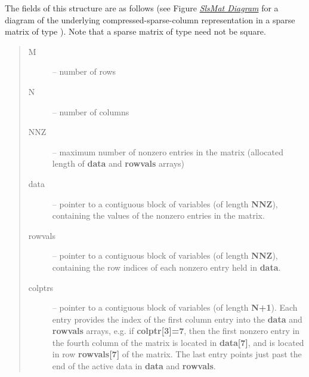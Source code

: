 \documentclass[letterpaper,10pt,english]{sphinxmanual}
\begin{document}
The fields of this structure are as follows (see Figure
{\hyperref[linear_solvers/SLS:sls-figure]{\emph{SlsMat Diagram}}}
for a diagram of the underlying compressed-sparse-column
representation in a sparse matrix of type {\hyperref[linear_solvers/SLS:SlsMat]{}}).  Note that a
sparse matrix of type {\hyperref[linear_solvers/SLS:SlsMat]{}} need not be square.
\begin{quote}\begin{description}
\item[{M}] \leavevmode
-- number of rows

\item[{N}] \leavevmode
--  number of columns

\item[{NNZ}] \leavevmode
-- maximum number of nonzero entries in the matrix (allocated
length of \textbf{data} and \textbf{rowvals} arrays)

\item[{data}] \leavevmode
-- pointer to a contiguous block of  variables (of
length \textbf{NNZ}), containing the values of the nonzero entries in the
matrix.

\item[{rowvals}] \leavevmode
-- pointer to a contiguous block of  variables (of
length \textbf{NNZ}), containing the row indices of each nonzero
entry held in \textbf{data}.

\item[{colptrs}] \leavevmode
-- pointer to a contiguous block of  variables (of
length \textbf{N+1}).  Each entry provides the index of the first column
entry into the \textbf{data} and \textbf{rowvals} arrays, e.g. if
\textbf{colptr{[}3{]}=7}, then the first nonzero entry in the fourth column
of the matrix is located in \textbf{data{[}7{]}}, and is located in row
\textbf{rowvals{[}7{]}} of the matrix.  The last entry points just past the
end of the active data in \textbf{data} and \textbf{rowvals}.

\end{description}\end{quote}
\end{document}
